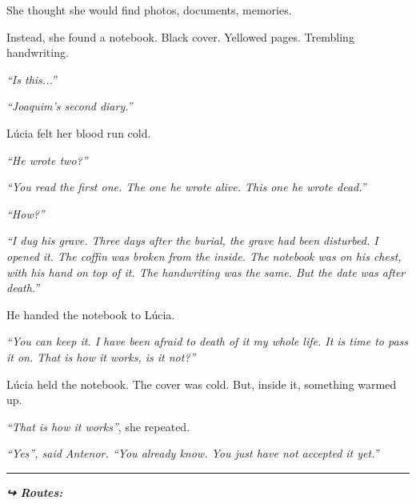 \noindent She thought she would find photos, documents, memories.

\noindent Instead, she found a notebook. Black cover. Yellowed pages. Trembling handwriting.

\noindent \textit{\textquotedblleft{}Is this...\textquotedblright{}}

\noindent \textit{\textquotedblleft{}Joaquim's second diary.\textquotedblright{}}

\noindent Lúcia felt her blood run cold.

\noindent \textit{\textquotedblleft{}He wrote two?\textquotedblright{}}

\noindent \textit{\textquotedblleft{}You read the first one. The one he wrote alive. This one he wrote dead.\textquotedblright{}}

\noindent \textit{\textquotedblleft{}How?\textquotedblright{}}

\noindent \textit{\textquotedblleft{}I dug his grave. Three days after the burial, the grave had been disturbed. I opened it. The coffin was broken from the inside. The notebook was on his chest, with his hand on top of it. The handwriting was the same. But the date was after death.\textquotedblright{}}

\noindent He handed the notebook to Lúcia.

\noindent \textit{\textquotedblleft{}You can keep it. I have been afraid to death of it my whole life. It is time to pass it on. That is how it works, is it not?\textquotedblright{}}

\noindent Lúcia held the notebook. The cover was cold. But, inside it, something warmed up.

\noindent \textit{\textquotedblleft{}That is how it works\textquotedblright{}}, she repeated.

\noindent \textit{\textquotedblleft{}Yes\textquotedblright{}\textit{, said Antenor. }\textquotedblleft{}You already know. You just have not accepted it yet.\textquotedblright{}}

\vspace{0.5em}\noindent\rule{\textwidth}{0.5pt}\vspace{0.5em}

\vspace{0.5em}
\noindent\textit{\textbf{↪ Routes:}  \rotasep {}}
